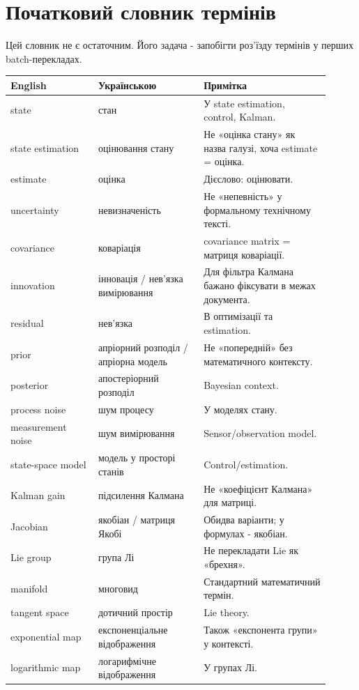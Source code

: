 \chapter{Початковий словник термінів}

Цей словник не є остаточним. Його задача - запобігти роз'їзду термінів у перших batch-перекладах.

\begin{longtable}{L{0.25\linewidth}L{0.30\linewidth}L{0.36\linewidth}}
\toprule
\textbf{English} & \textbf{Українською} & \textbf{Примітка}\\
\midrule
state & стан & У state estimation, control, Kalman.\\
state estimation & оцінювання стану & Не «оцінка стану» як назва галузі, хоча estimate = оцінка.\\
estimate & оцінка & Дієслово: оцінювати.\\
uncertainty & невизначеність & Не «непевність» у формальному технічному тексті.\\
covariance & коваріація & covariance matrix = матриця коваріації.\\
innovation & інновація / нев'язка вимірювання & Для фільтра Калмана бажано фіксувати в межах документа.\\
residual & нев'язка & В оптимізації та estimation.\\
prior & апріорний розподіл / апріорна модель & Не «попередній» без математичного контексту.\\
posterior & апостеріорний розподіл & Bayesian context.\\
process noise & шум процесу & У моделях стану.\\
measurement noise & шум вимірювання & Sensor/observation model.\\
state-space model & модель у просторі станів & Control/estimation.\\
Kalman gain & підсилення Калмана & Не «коефіцієнт Калмана» для матриці.\\
Jacobian & якобіан / матриця Якобі & Обидва варіанти; у формулах - якобіан.\\
Lie group & група Лі & Не перекладати Lie як «брехня».\\
manifold & многовид & Стандартний математичний термін.\\
tangent space & дотичний простір & Lie theory.\\
exponential map & експоненціальне відображення & Також «експонента групи» у контексті.\\
logarithmic map & логарифмічне відображення & У групах Лі.\\

\end{longtable}

